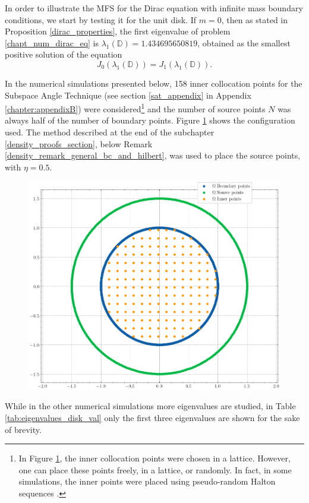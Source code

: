 In order to illustrate the MFS for the Dirac equation with infinite mass boundary conditions, we start by testing it for the unit disk. If \(m=0\), then as stated in Proposition \ref{dirac_properties}, the first eigenvalue of problem \eqref{chapt_num_dirac_eq} is \(\lambda_1(\mathbb{D})= 1.434695650819\), obtained as the smallest positive solution of the equation
\[
    J_0(\lambda_1(\mathbb{D})) = J_1(\lambda_1(\mathbb{D})).
\]

In the numerical simulations presented below, 158 inner collocation points for the Subspace Angle Technique (see section \ref{sat_appendix} in Appendix \ref{chapter:appendixB}) were considered\footnote{In Figure \ref{dirak_disk_col_m0}, the inner collocation points were chosen in a lattice. However, one can place these points freely, in a lattice, or randomly. In fact, in some simulations, the inner points were placed using pseudo-random Halton sequences \cite{halton1964algorithm}.} and the number of source points \(N\) was always half of the number of boundary points. Figure \ref{dirak_disk_col_m0} shows the configuration used. The method described at the end of the subchapter \ref{density_proofs_section}, below Remark \ref{density_remark_general_bc_and_hilbert}, was used to place the source points, with \(\eta=0.5\).

\begin{figure}[!htb]
    \centering
    \includegraphics[width=0.5\linewidth]{Images/Dirac/circle_m_0_col_points_158_inner_eta_05.png}
    \label{dirak_disk_col_m0}
\end{figure}

While in the other numerical simulations more eigenvalues are studied, in Table \ref{tab:eigenvalues_disk_val} only the first three eigenvalues are shown for the sake of brevity.

